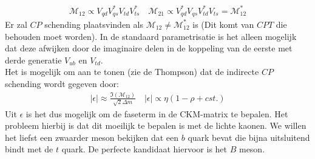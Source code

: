 \documentclass[../main.tex]{subfiles}
\begin{document}
\begin{minipage}[c]{0.5\textwidth}
    \begin{center}
    \end{center}
\end{minipage}
\begin{equation}
    \begin{aligned}
        \label{eq:kaon_osc_tijd_inv}
        \mathcal{M}_{12} \propto V_{q d} V_{q s}^{*} V_{t d} V_{t s}^{*} \quad \mathcal{M}_{21} \propto V_{q d}^{*} V_{q s} V_{t d}^{*} V_{t s}=\mathcal{M}_{12}^{*}
    \end{aligned}
\end{equation}
Er zal $CP$ schending plaatsvinden als $\mathcal{M}_{12} \neq \mathcal{M}_{12}^{*}$ is (Dit komt van $CPT$ die behouden moet worden). In de standaard parametrisatie is het alleen mogelijk dat deze afwijken door de imaginaire delen in de koppeling van de eerste met derde generatie $V_{u b}$ en $V_{t d}$.\\
Het is mogelijk om aan te tonen (zie de Thompson) dat de indirecte $CP$ schending wordt gegeven door:
\begin{equation}
    \begin{aligned}
        \label{eq:direct_cp_viol_kaon}
        |\epsilon| \approx \frac{\Im\left(\mathcal{M}_{12}\right)}{\sqrt{2} \Delta m} \quad|\epsilon| \propto \eta(1-\rho+c s t .)
    \end{aligned}
\end{equation}
Uit $\epsilon$ is het dus mogelijk om de faseterm in de CKM-matrix te bepalen. Het probleem hierbij is dat dit moeilijk te bepalen is met de lichte kaonen. We willen het liefst een zwaarder meson bekijken dat een $b$ quark bevat die bijna uitsluitend bindt met de $t$ quark. De perfecte kandidaat hiervoor is het $B$ meson.
\end{document}
